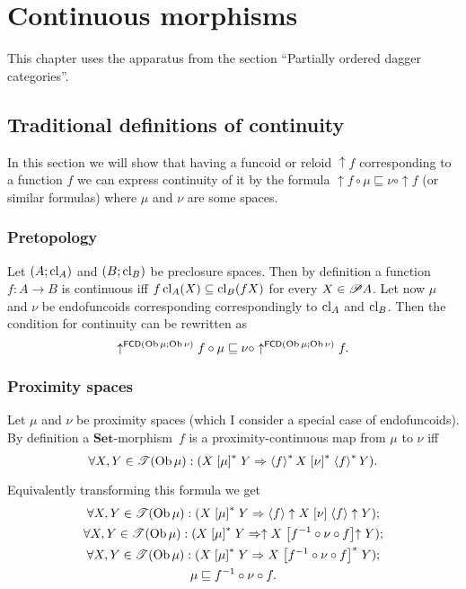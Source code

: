 
\chapter{Continuous morphisms}

This chapter uses the apparatus from the section ``Partially ordered
dagger categories''.


\section{Traditional definitions of continuity}

In this section we will show that having a funcoid or reloid $\uparrow f$
corresponding to a function $f$ we can express continuity of it by
the formula $\uparrow f\circ\mu\sqsubseteq\nu\circ\uparrow f$ (or
similar formulas) where $\mu$ and $\nu$ are some spaces.


\subsection{Pretopology}

Let $(A;\operatorname{cl}_{A})$ and $(B;\operatorname{cl}_{B})$ be preclosure spaces. Then by
definition a function $f:A\rightarrow B$ is continuous iff $f\operatorname{cl}_{A}(X)\subseteq\operatorname{cl}_{B}(fX)$
for every $X\in\mathscr{P} A$. Let now $\mu$ and $\nu$ be endofuncoids
corresponding correspondingly to $\operatorname{cl}_{A}$ and $\operatorname{cl}_{B}$. Then the
condition for continuity can be rewritten as
\[
\uparrow^{\mathsf{FCD}(\operatorname{Ob}\mu;\operatorname{Ob}\nu)}f\circ\mu\sqsubseteq\nu\circ\uparrow^{\mathsf{FCD}(\operatorname{Ob}\mu;\operatorname{Ob}\nu)}f.
\]



\subsection{Proximity spaces}

Let $\mu$ and $\nu$ be proximity spaces (which I consider a special
case of endofuncoids). By definition a $\mathbf{Set}$-morphism~$f$
is a proximity-continuous map from $\mu$
to $\nu$ iff
\[
\forall X,Y\in\mathscr{T}(\operatorname{Ob}\mu):(X\mathrel{\left[\mu\right]^{\ast}}Y\Rightarrow\left\langle f\right\rangle ^{\ast}X\mathrel{\left[\nu\right]^{\ast}}\left\langle f\right\rangle ^{\ast}Y).
\]


Equivalently transforming this formula we get
\begin{gather*}
\forall X,Y\in\mathscr{T}(\operatorname{Ob}\mu):(X\mathrel{\left[\mu\right]^{\ast}}Y\Rightarrow\left\langle f\right\rangle\uparrow X\mathrel{\left[\nu\right]}\left\langle f\right\rangle\uparrow Y);\\
\forall X,Y\in\mathscr{T}(\operatorname{Ob}\mu):(X\mathrel{\left[\mu\right]^{\ast}}Y\Rightarrow\uparrow X\mathrel{\left[f^{-1}\circ\nu\circ f\right]}\uparrow Y);\\
\forall X,Y\in\mathscr{T}(\operatorname{Ob}\mu):(X\mathrel{\left[\mu\right]^{\ast}}Y\Rightarrow X\mathrel{\left[f^{-1}\circ\nu\circ f\right]^{\ast}}Y);\\
\mu\sqsubseteq f^{-1}\circ\nu\circ f.
\end{gather*}


